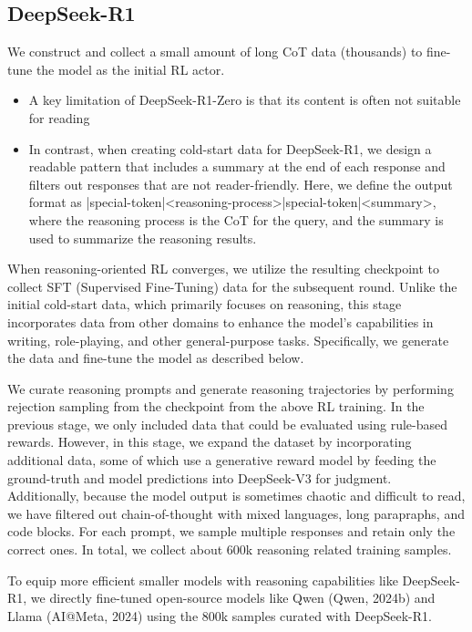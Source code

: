 \subsection{DeepSeek-R1}
We construct and collect a small amount of long CoT data (thousands) to fine-tune the model as the initial RL actor.

\begin{itemize}
	\item A key limitation of DeepSeek-R1-Zero is that its content is often not suitable for reading
	\item In contrast, when creating cold-start data for DeepSeek-R1, we design a readable pattern that includes a summary at the end of each response and filters out responses that are not reader-friendly. Here, we define the output format as |special-token|<reasoning-process>|special-token|<summary>, where the reasoning process is the CoT for the query, and the summary is used to summarize the reasoning results.
\end{itemize}

When reasoning-oriented RL converges, we utilize the resulting checkpoint to collect SFT (Supervised Fine-Tuning) data for the subsequent round. Unlike the initial cold-start data, which primarily focuses on reasoning, this stage incorporates data from other domains to enhance the model's capabilities in writing, role-playing, and other general-purpose tasks. Specifically, we generate the data and fine-tune the model as described below.

We curate reasoning prompts and generate reasoning trajectories by performing rejection sampling from the checkpoint from the above RL training. In the previous stage, we only included data that could be evaluated using rule-based rewards. However, in this stage, we expand the dataset by incorporating additional data, some of which use a generative reward model by feeding the ground-truth and model predictions into DeepSeek-V3 for judgment. Additionally, because the model output is sometimes chaotic and difficult to read, we have filtered out chain-of-thought with mixed languages, long parapraphs, and code blocks. For each prompt, we sample multiple responses and retain only the correct ones. In total, we collect about 600k reasoning related training samples.

To equip more efficient smaller models with reasoning capabilities like DeepSeek-R1, we directly fine-tuned open-source models like Qwen (Qwen, 2024b) and Llama (AI@Meta, 2024) using the 800k samples curated with DeepSeek-R1.
